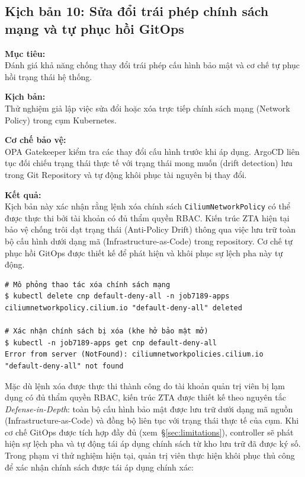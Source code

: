 \subsection{Kịch bản 10: Sửa đổi trái phép chính sách mạng và tự phục hồi GitOps}
\label{subsec:kb10_iac_poisoning}

\textbf{Mục tiêu:}\\
Đánh giá khả năng chống thay đổi trái phép cấu hình bảo mật và cơ chế tự phục hồi trạng thái hệ thống.

\textbf{Kịch bản:}\\
Thử nghiệm giả lập việc sửa đổi hoặc xóa trực tiếp chính sách mạng (Network Policy) trong cụm Kubernetes.

\textbf{Cơ chế bảo vệ:}\\
OPA Gatekeeper kiểm tra các thay đổi cấu hình trước khi áp dụng. ArgoCD liên tục đối chiếu trạng thái thực tế với trạng thái mong muốn (drift detection) lưu trong Git Repository và tự động khôi phục tài nguyên bị thay đổi.

\textbf{Kết quả:}\\
Kịch bản này xác nhận rằng lệnh xóa chính sách \texttt{CiliumNetworkPolicy} có thể được thực thi bởi tài khoản có đủ thẩm quyền RBAC. Kiến trúc ZTA hiện tại bảo vệ chống trôi dạt trạng thái (Anti-Policy Drift) thông qua việc lưu trữ toàn bộ cấu hình dưới dạng mã (Infrastructure-as-Code) trong repository. Cơ chế tự phục hồi GitOps được thiết kế để phát hiện và khôi phục sự lệch pha này tự động.

\begin{listing}[H]
\begin{verbatim}
# Mô phỏng thao tác xóa chính sách mạng
$ kubectl delete cnp default-deny-all -n job7189-apps
ciliumnetworkpolicy.cilium.io "default-deny-all" deleted

# Xác nhận chính sách bị xóa (khe hở bảo mật mở)
$ kubectl -n job7189-apps get cnp default-deny-all
Error from server (NotFound): ciliumnetworkpolicies.cilium.io "default-deny-all" not found
\end{verbatim}
\caption{Xóa thủ công chính sách default-deny tạo ra khe hở bảo mật tạm thời}
\label{lst:kb10_del_cmd}
\end{listing}

Mặc dù lệnh xóa được thực thi thành công do tài khoản quản trị viên bị lạm dụng có đủ thẩm quyền RBAC, kiến trúc ZTA được thiết kế theo nguyên tắc \textit{Defense-in-Depth}: toàn bộ cấu hình bảo mật được lưu trữ dưới dạng mã nguồn (Infrastructure-as-Code) và đồng bộ liên tục với trạng thái thực tế của cụm. Khi cơ chế GitOps được tích hợp đầy đủ (xem~\S\ref{sec:limitations}), controller sẽ phát hiện sự lệch pha và tự động tái áp dụng chính sách từ kho lưu trữ đã được ký số. Trong phạm vi thử nghiệm hiện tại, quản trị viên thực hiện khôi phục thủ công để xác nhận chính sách được tái áp dụng chính xác:

